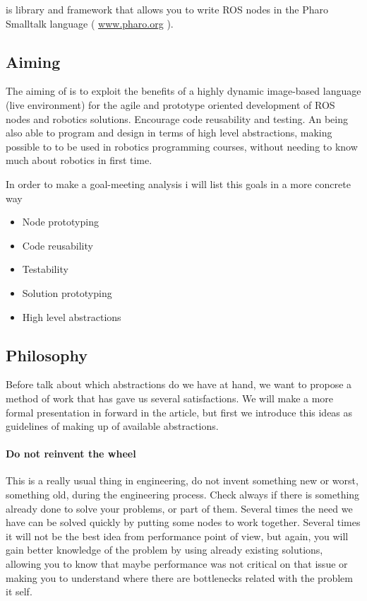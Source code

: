 \documentclass[a4paper,10pt,twoside]{book}
\begin{document}
		\pharos is library and framework that allows you to write ROS nodes in the Pharo Smalltalk language ( \hyperlink{www.pharo.org}{www.pharo.org} ). 
		
		\subsection{Aiming}
		
		The aiming of \fwkName{} is to exploit the benefits of a highly dynamic image-based language (live environment) for the agile and prototype oriented development of ROS nodes and robotics solutions. Encourage code reusability and testing.  An being also able to program and design in terms of high level abstractions, making possible to \pharos to be used in robotics programming courses, without needing to know much about robotics in first time. 
		
		In order to make a goal-meeting analysis i will list this goals in a more concrete way 
		
		\begin{itemize}
			\item Node prototyping
			\item Code reusability
			\item Testability
			\item Solution prototyping 
			\item High level abstractions
		\end{itemize}
		
		
		
		\subsection{Philosophy}
		
		
			Before talk about which abstractions do we have at hand, we want to propose a method of work that has gave us several satisfactions.	 We will make a more formal presentation in forward in the article, but first we introduce this ideas as guidelines of making up of available abstractions.
			
						
			\paragraph{Do not reinvent the wheel}
				
				This is a really usual thing in engineering, do not invent something new or worst, something old,  during the engineering process. Check always if there is something already done to solve your problems, or part of them.
				Several times the need we have can be solved quickly by putting some nodes to work together. Several times it will not be the best idea from performance point of view, but again, you will gain better knowledge of the problem by using already existing solutions, allowing you to know that maybe performance was not critical on that issue or making you to understand where there are bottlenecks related with the problem it self. 
			
\end{document}
